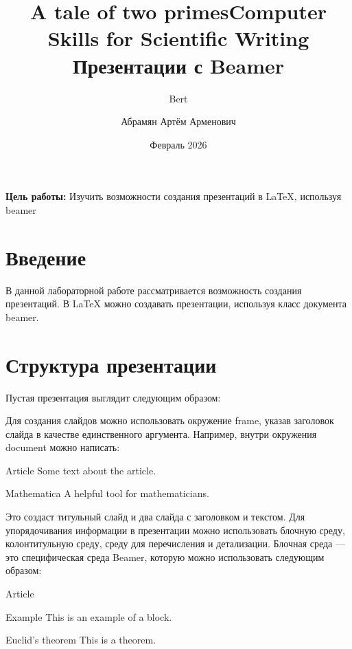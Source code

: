 \documentclass{article}
\author{Bert}
\title{A tale of two primes}
\title{Computer Skills for Scientific Writing\\Презентации с Beamer}
\author{Абрамян Артём Арменович}
\date{Февраль 2026}
\begin{document}
  \maketitle
  \pagebreak

  \textbf{Цель работы:} Изучить возможности создания презентаций в LaTeX, используя beamer
  \smallskip

  \section{Введение}
  \label{sec:intro}


  В данной лабораторной работе рассматривается возможность создания презентаций.
  В LaTeX можно создавать презентации, используя класс документа beamer.


  \section{Структура презентации}
  \label{sec:structure}

  Пустая презентация выглядит следующим образом:


    \begin{center}

    \end{center}

    Для создания слайдов можно использовать окружение frame, указав заголовок слайда в качестве единственного аргумента.
    Например, внутри окружения document можно написать:

    \begin{frame}
    \titlepage
    \end{frame}
    \begin{frame}{Article}
    Some text about the article.
    \end{frame}
    \begin{frame}{Mathematica}
    A helpful tool for mathematicians.
    \end{frame}

    Это создаст титульный слайд и два слайда с заголовком и текстом.
    Для упорядочивания информации в презентации можно использовать блочную среду, колонтитульную среду,
    среду для перечисления и детализации. Блочная среда — это специфическая среда Beamer, которую можно использовать следующим образом:

    \begin{frame}{Article}
    \begin{block}{Example}
    This is an example of a block.
    \end{block}
    \begin{block}{Euclid's theorem}
    This is a theorem.
    \end{block}
    \end{frame}
\end{document}
